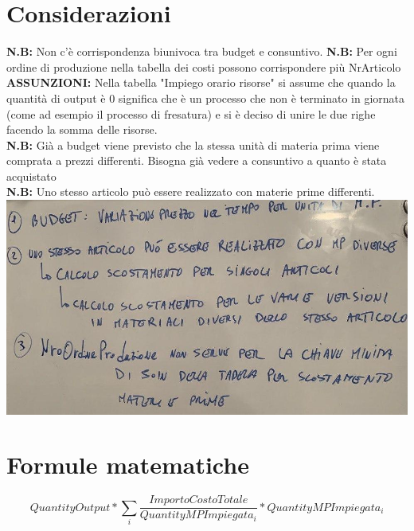 \documentclass{article}
\begin{document}
\section{Considerazioni}
\textbf{N.B:} Non c’è corrispondenza biunivoca tra budget e consuntivo.
\textbf{N.B:} Per ogni ordine di produzione nella tabella dei costi possono corrispondere più NrArticolo
\\\textbf{ASSUNZIONI:} Nella tabella "Impiego orario risorse" si assume che quando la quantità di output è 0 significa che è un processo che non è terminato in giornata (come ad esempio il 
processo di fresatura) e si è deciso di unire le due righe facendo la somma delle risorse.
\\\textbf{N.B:} Già a budget viene previsto che la stessa unità di materia prima viene comprata a prezzi differenti. Bisogna già vedere a consuntivo a quanto è stata acquistato
\\\textbf{N.B:} Uno stesso articolo può essere realizzato con materie prime differenti.
\\\includegraphics[scale = 0.4]{Lavagnetta.jpg}
\section{Formule matematiche}

$$QuantityOutput*\sum_{i}\frac{ImportoCostoTotale}{QuantityMPImpiegata_{i}}*QuantityMPImpiegata_{i}$$
\end{document}
